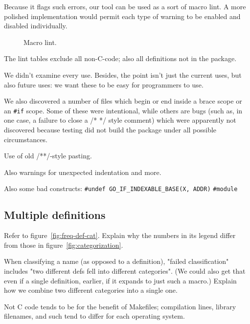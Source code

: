 \documentclass[10pt]{article}
\begin{document}
Because it flags such errors, our tool can be used as a sort of macro
lint.  A more polished implementation would permit each type of warning to
be enabled and disabled individually.

\begin{figure}
  {\small\centerline{}}
  
  \caption{Macro lint.}
  \label{fig:macro-lint}
\end{figure}

{}




The lint tables exclude all non-C-code; also all definitions not in the package.

        We didn't examine every use.  Besides, the point isn't just the
          current uses, but also future uses:  we want these to be easy for
          programmers to use.

        We also discovered a number of files which begin or end inside a
          brace scope or an {\tt \#if} scope.  Some of these were intentional, while
          others are bugs (such as, in one case, a failure to close a /* */
          style comment) which were apparently not discovered because testing
          did not build the package under all possible circumstances.

          Use of old /**/-style pasting.

        Also warnings for unexpected indentation and more.

        Also some bad constructs:
          {\tt \#undef \verb|GO_IF_INDEXABLE_BASE|(X, ADDR)}
          {\tt \#module}

\subsection{Multiple definitions}

Refer to figure~\ref{fig:freq-def-cat}.  Explain why the numbers in its
legend differ from those in figure~\ref{fig:categorization}.

        When classifying a name (as opposed to a definition), "failed
          classification" includes "two different defs fell into different
          categories".  (We could also get that even if a single
          definition, earlier, if it expands to just such a macro.)
          Explain how we combine two different categories into a single one.

        Not C code tends to be for the benefit of Makefiles; compilation
          lines, library filenames, and such tend to differ for each
          operating system.  
\end{document}
